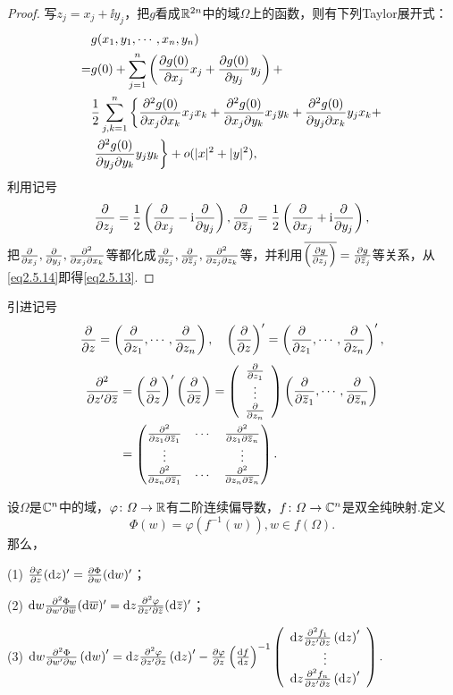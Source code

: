 \begin{proof}
	写$z_j=x_j+\ii y_j$，把$g$看成$\MR^{2n}$中的域$\Omega$上的函数，则有下列Taylor展开式：
	\begin{align}\label{eq2.5.14}
		&g(x_1,y_1,\cdots,x_n,y_n)\notag\\
	   =&g(0)+\sum_{j=1}^{n}\left(\pp{g(0)}{x_j}x_j+\pp{g(0)}{y_j}y_j\right)+\notag\\
	   &\frac12\sum_{j,k=1}^{n}\left\{\pppp{g(0)}{x_j}{x_k}x_jx_k+\pppp{g(0)}{x_j}{y_k}x_jy_k+\pppp{g(0)}{y_j}{x_k}y_jx_k+\right.\notag\\
	   &\left.\pppp{g(0)}{y_j}{y_k}y_jy_k\right\}+o(|x|^2+|y|^2),
	\end{align}
利用记号
\[\pp{}{z_j}=\frac12\left(\pp{}{x_j}-\ii\pp{}{y_j}\right),\pp{}{\bar{z}_j}=\frac12\left(\pp{}{x_j}+\ii\pp{}{y_j}\right),\]
把$\pp{}{x_j},\pp{}{y_j},\pppp{}{x_j}{x_k}$等都化成$\pp{}{z_j},\pp{}{\bar{z}_j},\pppp{}{z_j}{z_k}$等，并利用$\bar{\left(\pp{g}{z_j}\right)}=\pp{g}{\bar{z}_j}$等关系，从\eqref{eq2.5.14}即得\eqref{eq2.5.13}.
\end{proof}
引进记号
\[\pp{}{z}=\left(\pp{}{z_1},\cdots,\pp{}{z_n}\right),\quad \left(\pp{}{z}\right)'=\left(\pp{}{z_1},\cdots,\pp{}{z_n}\right)',\]
\begin{align*}
	\pppp{}{z'}{\bar{z}}
	&=\left(\pp{}{z}\right)'\left(\pp{}{\bar{z}}\right)=\left(\begin{array}{ccc}
		\pp{}{z_1} \\
		\vdots \\
		\pp{}{z_n}
	\end{array}\right)
\left(\pp{}{\bar{z}_1},\cdots,\pp{}{\bar{z}_n}\right)\\
&=\begin{pmatrix}
	\pppp{}{z_1}{\bar{z}_1} & \cdots & \pppp{}{z_1}{\bar{z}_n}\\
	\vdots & & \vdots\\
	\pppp{}{z_n}{\bar{z}_1} & \cdots & \pppp{}{z_n}{\bar{z}_n}
\end{pmatrix}.
\end{align*}
\begin{lemma}\label{lem2.5.10}
	设$\Omega$是$\MC^n$中的域，$\varphi\colon\Omega\to\MR$有二阶连续偏导数，$f\colon\Omega\to\MC^n$是双全纯映射.定义
	\[\Phi(w)=\varphi(f^{-1}(w)),w\in f(\Omega).\]
	那么，
	
	(1)\hypertarget{2.5.10}{}
	$\pp{\varphi}{z}(\mathrm{d}z)'=\pp{\Phi}{w}(\mathrm{d}w)'$；
	
	(2)\hypertarget{2.5.10}{}
	$\mathrm{d}w\pppp{\Phi}{w'}{\bar{w}}(\mathrm{d}\bar{w})'=\mathrm{d}z\pppp{\varphi}{z'}{\bar{z}}(\mathrm{d}\bar{z})'$；
	
	(3)\hypertarget{2.5.10}{}
	$\mathrm{d}w\pppp{\Phi}{w'}{w}\left(\mathrm{d}w\right)'=\mathrm{d}z\pppp{\varphi}{z'}{z}\left(\mathrm{d}z\right)'-\pp{\varphi}{z}\left(\dd{f}{z}\right)^{-1}\left(\begin{array}{ccc}
		\mathrm{d}z\pppp{f_1}{z'}{z}\left(\mathrm{d}z\right)'\\
		\vdots\\
		\mathrm{d}z\pppp{f_n}{z'}{z}\left(\mathrm{d}z\right)'
	\end{array}\right).$
\end{lemma}
